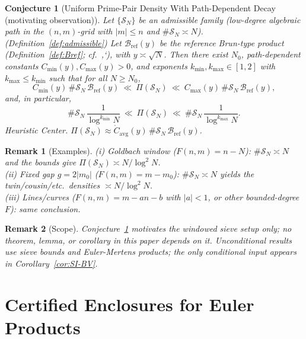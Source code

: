 \documentclass[11pt]{article}
\theoremstyle{inline}
\newtheorem*{remark}{Remark}
\theoremstyle{break}
\theoremstyle{break}
\theoremstyle{break}
\theoremstyle{break}
\theoremstyle{break}
\newtheorem{conjecture}{Conjecture}
\theoremstyle{break}
\theoremstyle{break}
\theoremstyle{inline}
\newcommand{\tavg}{{\scriptscriptstyle\mathrm{avg}}}
\newcommand{\tref}{{\scriptscriptstyle\mathrm{ref}}}
\newcommand{\Cpred}{\mathring{C}}   %
\newcommand{\Bref}{\mathcal{B}_\tref}
\begin{document}
\begin{conjecture}[Uniform Prime-Pair Density With Path-Dependent Decay (motivating observation)]\label{conj:uniform-C}
Let \( \{\mathcal{S}_N\} \) be an admissible family (low-degree algebraic path in the \( (n,m) \)-grid with \( |m|\le n \) and \( \#\mathcal{S}_N\asymp N \)).  (Definition~\ref{def:admissible})
Let \( \Bref(y) \) be the reference Brun-type product
(Definition~\ref{def:Bref}; cf.~\cite[§1.6]{HalberstamRichert1974},`\cite[Ch.~4]{Riesel1994}),
with \( y\asymp\sqrt{N} \).
Then there exist \( N_0 \), path-dependent constants \( C_{\min}(y),C_{\max}(y)>0 \), and exponents
\( k_{\min},k_{\max}\in[1,2] \) with \( k_{\max} \le k_{\min} \) such that for all \( N\ge N_0 \),
\begin{equation}
C_{\min}(y)\,\#\mathcal{S}_N\,\Bref(y)
\ \ll\
\Pi(\mathcal{S}_N)
\ \ll\
C_{\max}(y)\,\#\mathcal{S}_N\,\Bref(y),
\end{equation}
and, in particular,
\begin{equation}
\#\mathcal{S}_N\,\frac{1}{\log^{k_{\min}} N}
\ \ll\
\Pi(\mathcal{S}_N)
\ \ll\
\#\mathcal{S}_N\,\frac{1}{\log^{k_{\max}} N}.
\end{equation}
\emph{Heuristic Center.}\quad
\( \Pi(\mathcal{S}_N)\approx \Cpred_\tavg(y)\,\#\mathcal{S}_N\,\Bref(y) \).
\end{conjecture}

\begin{remark}[Examples]
(i) \emph{Goldbach window} (\( F(n,m)=n-N \)): \( \#\mathcal{S}_N\asymp N \) and the bounds give \( \Pi(\mathcal{S}_N)\asymp N/\log^2 N \).\\
(ii) \emph{Fixed gap} \( g=2|m_0| \) (\( F(n,m)=m-m_0 \)): \( \#\mathcal{S}_N\asymp N \) yields the twin/cousin/etc.\ densities \( \asymp N/\log^2 N \).\\
(iii) \emph{Lines/curves} (\( F(n,m)=m-an-b \) with \( |a|<1 \), or other bounded-degree \( F \)): same conclusion.
\end{remark}

\begin{remark}[Scope]
Conjecture~\ref{conj:uniform-C} motivates the windowed sieve setup only; no theorem, lemma, or corollary in this paper depends on it. Unconditional results use sieve bounds and Euler-Mertens products; the only conditional input appears in Corollary~\ref{cor:SI-BV}.
\end{remark}


\section{Certified Enclosures for Euler Products}\label{app:enclosures}
\end{document}
